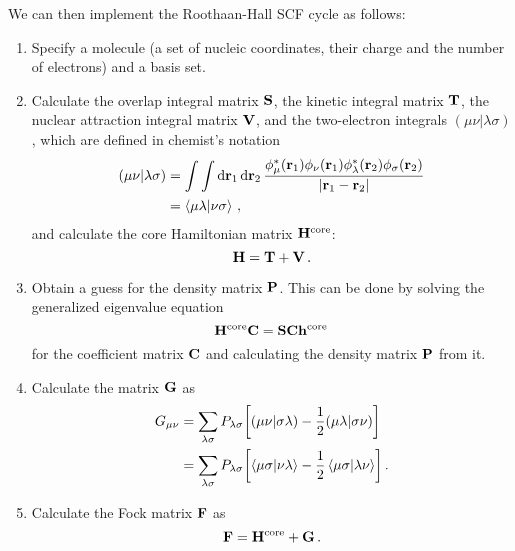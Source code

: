 \documentclass[12pt]{article}
\begin{document}
    We can then implement the Roothaan-Hall SCF cycle as follows:
    \begin{enumerate}
        \item Specify a molecule (a set of nucleic coordinates, their charge and the number of electrons) and a basis set.

        \item Calculate the overlap integral matrix $\vb{S}$, the kinetic integral matrix $\vb{T}$, the nuclear attraction integral matrix $\vb{V}$, and the two-electron integrals $(\mu \nu|\lambda \sigma)$, which are defined in chemist's notation
        \begin{align}
            (\mu \nu|\lambda \sigma) &= \int \int \dd{\vb{r}_1} \dd{\vb{r}_2} \frac{\phi_\mu^*(\vb{r}_1) \phi_\nu(\vb{r}_1) \phi_\lambda^*(\vb{r}_2) \phi_\sigma(\vb{r}_2)}{|\vb{r}_1 - \vb{r}_2|} \\
            &= \braket{\mu \lambda}{\nu \sigma} \thinspace ,
        \end{align}
        and calculate the core Hamiltonian matrix $\vb{H}^\text{core}$:
        \begin{equation}
            \vb{H} = \vb{T} + \vb{V} \thinspace .
        \end{equation}

        \item Obtain a guess for the density matrix $\vb{P}$. This can be done by solving the generalized eigenvalue equation
        \begin{equation}
            \vb{H}^\text{core} \vb{C} = \vb{S} \vb{C} \vb{h}^\text{core}
        \end{equation}
        for the coefficient matrix $\vb{C}$ and calculating the density matrix $\vb{P}$ from it.

        \item \label{item:scf:g_matrix}  Calculate the matrix $\vb{G}$ as
        \begin{align}
            G_{\mu \nu} &= \sum_{\lambda \sigma} P_{\lambda \sigma} \qty[ (\mu \nu|\sigma \lambda) - \frac{1}{2} (\mu \lambda|\sigma \nu)] \\
            &= \sum_{\lambda \sigma} P_{\lambda \sigma} \qty[ \braket{\mu \sigma}{\nu \lambda} - \frac{1}{2} \braket{\mu \sigma}{\lambda \nu}] \thinspace .
        \end{align}

        \item Calculate the Fock matrix $\vb{F}$ as
        \begin{equation} \label{eq:fock_matrix}
            \vb{F} = \vb{H}^\text{core} + \vb{G} \thinspace .
        \end{equation}


\end{enumerate}
\end{document}
